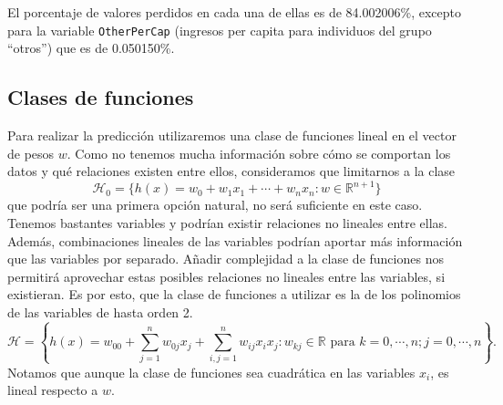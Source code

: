 \documentclass[a4paper, 20pt]{article}
\begin{document}
{El porcentaje de valores perdidos en cada una de ellas es de 84.002006\%, excepto para la variable \texttt{OtherPerCap} (ingresos per capita para individuos del grupo ``otros'')  que es de 0.050150\%.


\subsection{Clases de funciones}
Para realizar la predicción utilizaremos una clase de funciones lineal en el vector de pesos $w$. Como no tenemos mucha información sobre cómo se comportan los datos y qué relaciones existen entre ellos, consideramos que limitarnos a la clase \[
\mathcal{H}_0 = \{h(x) = w_0 + w_1x_1 +\cdots + w_nx_n : w \in \mathbb{R}^{n+1}\}
\]
que podría ser una primera opción natural, no será suficiente en este caso. Tenemos bastantes variables y podrían existir relaciones no lineales entre ellas. Además, combinaciones lineales de las variables podrían aportar más información que las variables por separado. Añadir complejidad a la clase de funciones nos permitirá aprovechar estas posibles relaciones no lineales entre las variables, si existieran. Es por esto, que la clase de funciones a utilizar es la de los polinomios de las variables de hasta orden 2.
 \[
\mathcal{H} = \left \{ h(x) = w_{00} +\sum_{j=1}^nw_{0j}x_j + \sum_{i,j = 1}^nw_{ij} x_ix_j: w_{kj} \in \mathbb{R} \text{ para } k = 0,\cdots, n; j=0,\cdots,n\right\}.
\]
Notamos que aunque la clase de funciones sea cuadrática en las variables $x_i$, es lineal respecto a $w$.


}
\end{document}
